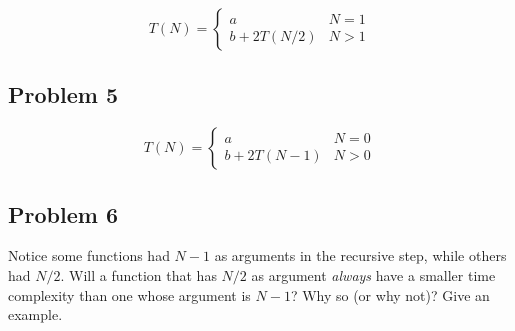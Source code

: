 \documentclass[11 pt]{article}
\begin{document}
\[ 
    T(N) = 
    \begin{cases} 
        a & N = 1 \\
        b + 2T(N/2) & N > 1
    \end{cases}
\]

\subsection{Problem 5}

\[ 
    T(N) = 
    \begin{cases} 
        a & N = 0 \\
        b + 2T(N-1) & N > 0
    \end{cases}
\]

\subsection{Problem 6}

\noindent Notice some functions had $N-1$ as arguments in the recursive step, while others had $N/2$. Will a function that has $N/2$ as argument \textit{always} have a smaller time complexity than one whose argument is $N-1$? Why so (or why not)? Give an example.
\end{document}
